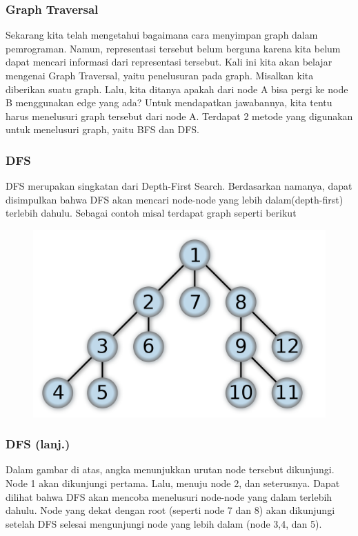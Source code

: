 \begin{frame}
\frametitle{Graph Traversal}

Sekarang kita telah mengetahui bagaimana cara menyimpan graph dalam pemrograman. Namun, representasi tersebut belum berguna karena kita belum dapat mencari informasi dari representasi tersebut.\newline\newline
Kali ini kita akan belajar mengenai \alert{Graph Traversal}, yaitu penelusuran pada graph. Misalkan kita diberikan suatu graph. Lalu, kita ditanya apakah dari node A bisa pergi ke node B menggunakan edge yang ada? Untuk mendapatkan jawabannya, kita tentu harus menelusuri graph tersebut dari node A.\newline\newline
Terdapat 2 metode yang digunakan untuk menelusuri graph, yaitu BFS dan DFS.
\end{frame}

\begin{frame}
\frametitle{DFS}

\alert{DFS} merupakan singkatan dari Depth-First Search. Berdasarkan namanya, dapat disimpulkan bahwa DFS akan mencari node-node yang lebih dalam(depth-first) terlebih dahulu. Sebagai contoh misal terdapat graph seperti berikut

\begin{figure}
  \centering
  \includegraphics[width=6 cm]{asset/dfs.png}
\end{figure}
\end{frame}

\begin{frame}
\frametitle{DFS (lanj.)}
Dalam gambar di atas, angka menunjukkan urutan node tersebut dikunjungi. Node 1 akan dikunjungi pertama. Lalu, menuju node 2, dan seterusnya. Dapat dilihat bahwa DFS akan mencoba menelusuri node-node yang dalam terlebih dahulu.
\newline\newline
Node yang dekat dengan root (seperti node 7 dan 8) akan dikunjungi setelah DFS selesai mengunjungi node yang lebih dalam (node 3,4, dan 5).
\end{frame}

